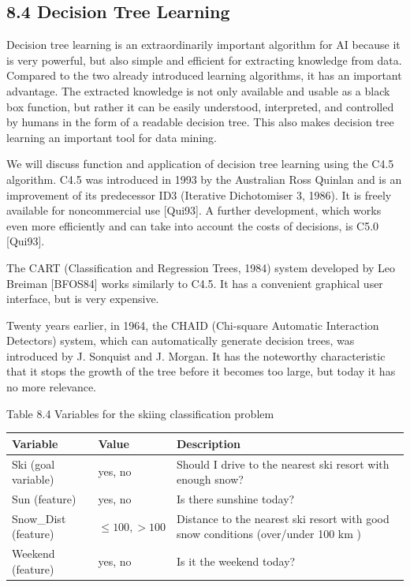 \documentclass[10pt]{article}
\begin{document}
\subsection*{8.4 Decision Tree Learning}
Decision tree learning is an extraordinarily important algorithm for AI because it is very powerful, but also simple and efficient for extracting knowledge from data. Compared to the two already introduced learning algorithms, it has an important advantage. The extracted knowledge is not only available and usable as a black box function, but rather it can be easily understood, interpreted, and controlled by humans in the form of a readable decision tree. This also makes decision tree learning an important tool for data mining.

We will discuss function and application of decision tree learning using the C4.5 algorithm. C4.5 was introduced in 1993 by the Australian Ross Quinlan and is an improvement of its predecessor ID3 (Iterative Dichotomiser 3, 1986). It is freely available for noncommercial use [Qui93]. A further development, which works even more efficiently and can take into account the costs of decisions, is C5.0 [Qui93].

The CART (Classification and Regression Trees, 1984) system developed by Leo Breiman [BFOS84] works similarly to C4.5. It has a convenient graphical user interface, but is very expensive.

Twenty years earlier, in 1964, the CHAID (Chi-square Automatic Interaction Detectors) system, which can automatically generate decision trees, was introduced by J. Sonquist and J. Morgan. It has the noteworthy characteristic that it stops the growth of the tree before it becomes too large, but today it has no more relevance.

Table 8.4 Variables for the skiing classification problem

\begin{center}
\begin{tabular}{|l|l|l|}
\hline
Variable & Value & Description \\
\hline
Ski (goal variable) & yes, no & Should I drive to the nearest ski resort with enough snow? \\
\hline
Sun (feature) & yes, no & Is there sunshine today? \\
\hline
Snow\_Dist (feature) & $\leq 100,>100$ & Distance to the nearest ski resort with good snow conditions (over/under 100 km ) \\
\hline
Weekend (feature) & yes, no & Is it the weekend today? \\
\hline
\end{tabular}
\end{center}
\end{document}
